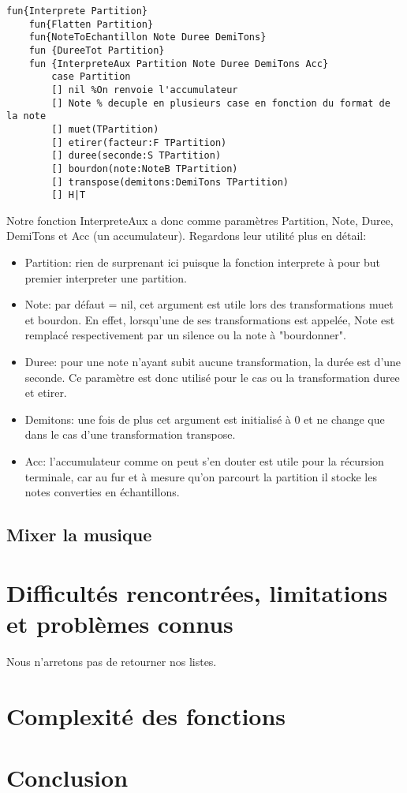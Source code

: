 \documentclass[a4paper,12pt]{report}
\begin{document}
\begin{lstlisting}[frame=single] 
fun{Interprete Partition}
	fun{Flatten Partition}
	fun{NoteToEchantillon Note Duree DemiTons}
	fun {DureeTot Partition}
	fun {InterpreteAux Partition Note Duree DemiTons Acc}
		case Partition
		[] nil %On renvoie l'accumulateur
		[] Note % decuple en plusieurs case en fonction du format de la note
		[] muet(TPartition)
		[] etirer(facteur:F TPartition)
		[] duree(seconde:S TPartition)
		[] bourdon(note:NoteB TPartition)
		[] transpose(demitons:DemiTons TPartition)
		[] H|T			
\end{lstlisting}

Notre fonction InterpreteAux a donc comme paramètres Partition, Note, Duree, DemiTons et Acc (un accumulateur). Regardons leur utilité plus en détail:
\begin{itemize}
\item Partition: rien de surprenant ici puisque la fonction interprete à pour but premier interpreter une partition. 
\item Note: par défaut = nil, cet argument est utile lors des transformations muet et bourdon. En effet, lorsqu'une de ses transformations est appelée, Note est remplacé respectivement par un silence ou la note à "bourdonner".  
\item Duree: pour une note n'ayant subit aucune transformation, la durée est d'une seconde. Ce paramètre est donc utilisé pour le cas ou la transformation duree et etirer.
\item Demitons: une fois de plus cet argument est initialisé à 0 et ne change que dans le cas d'une transformation transpose.
\item Acc: l'accumulateur comme on peut s'en douter est utile pour la récursion terminale, car au fur et à mesure qu'on parcourt la partition il stocke les notes converties en échantillons. 
\end{itemize}
\subsection{Mixer la musique}


\section{Difficultés rencontrées, limitations et problèmes connus}
Nous n'arretons pas de retourner nos listes.

\section{Complexité des fonctions}

\section{Conclusion}
\end{document}
